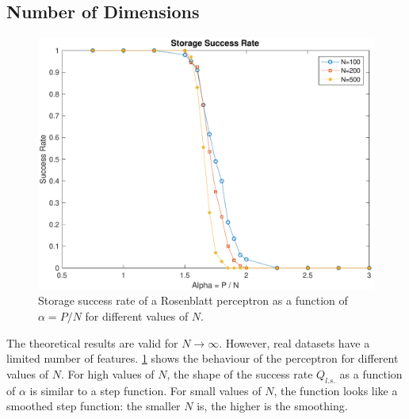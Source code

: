 \subsection{Number of Dimensions}
\label{subsec:dimensions}
\begin{figure}[t]
	\centering
	\includegraphics[width=\columnwidth]{figures/multiple_n}
    \caption{Storage success rate of a Rosenblatt perceptron as a function of $\alpha = P / N$ for different values of $N$.}
	\label{fig:multiple_n}
\end{figure}

The theoretical results are valid for $N \to \infty$.
However, real datasets have a limited number of features.
\cref{fig:multiple_n} shows the behaviour of the perceptron for different values of $N$.
For high values of $N$, the shape of the success rate $Q_{l.s.}$ as a function of $\alpha$ is similar to a step function.
For small values of $N$, the function looks like a smoothed step function:
the smaller $N$ is, the higher is the smoothing.

